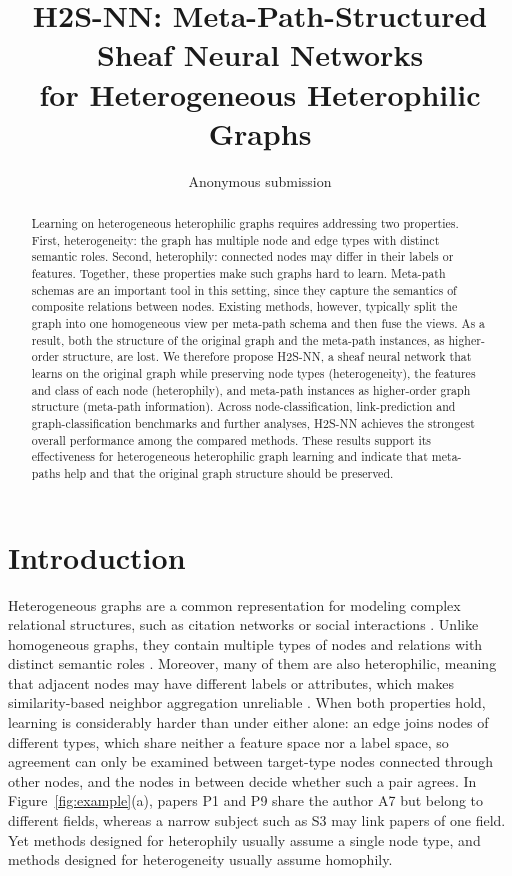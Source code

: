 \documentclass{article}
\title{H2S-NN: Meta-Path-Structured Sheaf Neural Networks\\ for Heterogeneous Heterophilic Graphs}
\author{
    Anonymous submission
}
\newcommand{\method}{\textsc{H2S-NN}}
\begin{document}
\maketitle

\begin{abstract}
Learning on heterogeneous heterophilic graphs requires addressing two properties. First, heterogeneity: the graph has multiple node and edge types with distinct semantic roles. Second, heterophily: connected nodes may differ in their labels or features. Together, these properties make such graphs hard to learn. Meta-path schemas are an important tool in this setting, since they capture the semantics of composite relations between nodes. Existing methods, however, typically split the graph into one homogeneous view per meta-path schema and then fuse the views. As a result, both the structure of the original graph and the meta-path instances, as higher-order structure, are lost. We therefore propose \method{}, a sheaf neural network that learns on the original graph while preserving node types (heterogeneity), the features and class of each node (heterophily), and meta-path instances as higher-order graph structure (meta-path information). Across node-classification, link-prediction and graph-classification benchmarks and further analyses, \method{} achieves the strongest overall performance among the compared methods. These results support its effectiveness for heterogeneous heterophilic graph learning and indicate that meta-paths help and that the original graph structure should be preserved.


\end{abstract}

\section{Introduction}
\label{sec:introduction}

Heterogeneous graphs are a common representation for modeling complex relational structures, such as citation networks \cite{liu2014meta} or social interactions \cite{singh2025overview}. Unlike homogeneous graphs, they contain multiple types of nodes and relations with distinct semantic roles \cite{sun2013mining}. Moreover, many of them are also heterophilic, meaning that adjacent nodes may have different labels or attributes, which makes similarity-based neighbor aggregation unreliable \cite{lin2025heterophily}. When both properties hold, learning is considerably harder than under either alone: an edge joins nodes of different types, which share neither a feature space nor a label space, so agreement can only be examined between target-type nodes connected through other nodes, and the nodes in between decide whether such a pair agrees. In Figure~\ref{fig:example}(a), papers P1 and P9 share the author A7 but belong to different fields, whereas a narrow subject such as S3 may link papers of one field. Yet methods designed for heterophily usually assume a single node type, and methods designed for heterogeneity usually assume homophily.
\end{document}
